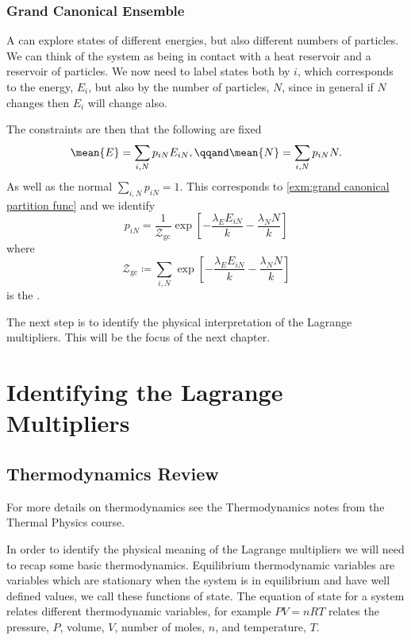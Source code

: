 \documentclass[fleqn]{NotesClass}
\newcommand*{\gcpartition}{\mathcal{Z}_{\mathrm{gc}}}
\begin{document}
    \subsection{Grand Canonical Ensemble}
    A  can explore states of different energies, but also different numbers of particles.
    We can think of the system as being in contact with a heat reservoir and a reservoir of particles.
    We now need to label states both by \(i\), which corresponds to the energy, \(E_i\), but also by the number of particles, \(N\), since in general if \(N\) changes then \(E_i\) will change also.
    
    The constraints are then that the following are fixed
    \begin{equation}
        \mean{E} = \sum_{i, N} p_{iN} E_{iN}, \qqand \mean{N} = \sum_{i, N} p_{iN}N.
    \end{equation}
    As well as the normal \(\sum_{i, N} p_{iN} = 1\).
    This corresponds to \cref{exm:grand canonical partition func} and we identify
    \begin{equation}
        p_{iN} = \frac{1}{\gcpartition} \exp\left[ -\frac{\lambda_E E_{iN}}{k} - \frac{\lambda_N N}{k} \right]
    \end{equation}
    where
    \begin{equation}
        \gcpartition \coloneqq \sum_{i, N} \exp\left[ -\frac{\lambda_E E_{iN}}{k} - \frac{\lambda_N N}{k} \right]
    \end{equation}
    is the .
    
    The next step is to identify the physical interpretation of the Lagrange multipliers.
    This will be the focus of the next chapter.
    
    \chapter{Identifying the Lagrange Multipliers}
    \section{Thermodynamics Review}
    \begin{rmk}
        For more details on thermodynamics see the Thermodynamics notes from the Thermal Physics course.
    \end{rmk}
    In order to identify the physical meaning of the Lagrange multipliers we will need to recap some basic thermodynamics.
    Equilibrium thermodynamic variables are variables which are stationary when the system is in equilibrium and have well defined values, we call these functions of state.
    The equation of state for a system relates different thermodynamic variables, for example \(PV = nRT\) relates the pressure, \(P\), volume, \(V\), number of moles, \(n\), and temperature, \(T\).
    
\end{document}
